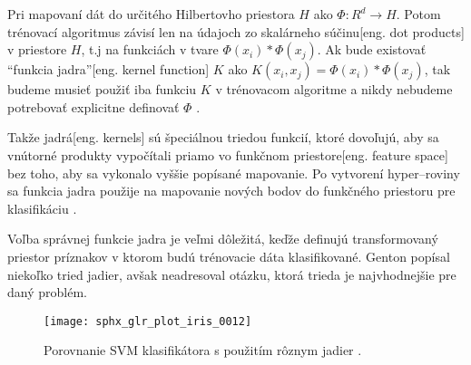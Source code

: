 Pri mapovaní dát do určitého Hilbertovho priestora \cite{prop:HilbertSpace} $H$ ako $\Phi:R^d \rightarrow H$.
Potom trénovací algoritmus závisí len na údajoch zo skalárneho súčinu[eng. dot products] v priestore $H$, t.j na funkciách v tvare $\Phi(x_i) * \Phi(x_j)$.
Ak bude existovať ``funkcia jadra''[eng. kernel function] $K$ ako $K(x_i, x_j) = \Phi(x_i)*\Phi(x_j)$, tak budeme musieť použiť iba funkciu $K$ v trénovacom algoritme
    a nikdy nebudeme potrebovať explicitne definovať $\Phi$ \cite{prop:SupervisedMachineLearning}.

Takže jadrá[eng. kernels] sú špeciálnou triedou funkcií, ktoré dovoľujú, aby sa vnútorné produkty vypočítali priamo vo funkčnom priestore[eng. feature space] bez toho, aby sa vykonalo vyššie popísané mapovanie.
Po vytvorení hyper--roviny sa funkcia jadra použije na mapovanie nových bodov do funkčného priestoru pre klasifikáciu \cite{prop:SupervisedMachineLearning}.

Voľba správnej funkcie jadra je veľmi dôležitá, keďže definujú transformovaný priestor príznakov v ktorom budú trénovacie dáta klasifikované.
Genton \cite{prop:KernelClasses} popísal niekoľko tried jadier, avšak neadresoval otázku, ktorá trieda je najvhodnejšie pre daný problém.

\begin{comment}
    Zoznam populárnych jadier \cite{prop:SupervisedMachineLearning}:
    \begin{equation}
        K(x, y) = (x*y+1)^P
    \end{equation}
    \begin{equation}
        K(x, y) = e^{\frac{-||x-y||^2}{2 \sigma^2}}
    \end{equation}
    \begin{equation}
        K(x, y) = tanh(\kappa x*y - \delta)^P
    \end{equation}
\end{comment}


\begin{figure}[H]
	\centering
	\texttt{[image: sphx\_glr\_plot\_iris\_0012]}
	\caption{Porovnanie SVM klasifikátora s použitím rôznym jadier \cite{odkaz:SVMImage}.}
	\label{pic:SVMComparison}
\end{figure}



